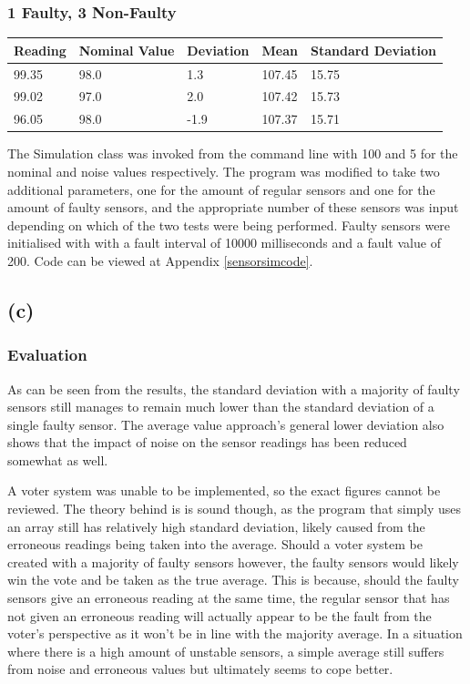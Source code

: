 \documentclass[]{report}
\begin{document}
				\subsubsection{1 Faulty, 3 Non-Faulty}
					\begin{table}[h!]
						\begin{tabular}{| l | l | l | l | l |}
							\hline
							Reading & Nominal Value & Deviation & Mean   & Standard Deviation \\
							\hline
							99.35   & 98.0          & 1.3       & 107.45 & 15.75              \\
							99.02   & 97.0          & 2.0       & 107.42 & 15.73              \\
							96.05   & 98.0          & -1.9      & 107.37 & 15.71              \\
							\hline
						\end{tabular}
					\end{table}
				
				The Simulation class was invoked from the command line with 100 and 5 for the nominal and noise values respectively. The program was modified to take two additional parameters, one for the amount of regular sensors and one for the amount of faulty sensors, and the appropriate number of these sensors was input depending on which of the two tests were being performed. Faulty sensors were initialised with with a fault interval of 10000 milliseconds and a fault value of 200. Code can be viewed at Appendix \ref{sensorsimcode}.
				
			\subsection{(c)}
				\subsubsection{Evaluation}
				As can be seen from the results, the standard deviation with a majority of faulty sensors still manages to remain much lower than the standard deviation of a single faulty sensor. The average value approach's general lower deviation also shows that the impact of noise on the sensor readings has been reduced somewhat as well.
				
				A voter system was unable to be implemented, so the exact figures cannot be reviewed. The theory behind is is sound though, as the program that simply uses an array still has relatively high standard deviation, likely caused from the erroneous readings being taken into the average. Should a voter system be created with a majority of faulty sensors however, the faulty sensors would likely win the vote and be taken as the true average. This is because, should the faulty sensors give an erroneous reading at the same time, the regular sensor that has not given an erroneous reading will actually appear to be the fault from the voter's perspective as it won't be in line with the majority average. In a situation where there is a high amount of unstable sensors, a simple average still suffers from noise and erroneous values but ultimately seems to cope better.
			
\end{document}
